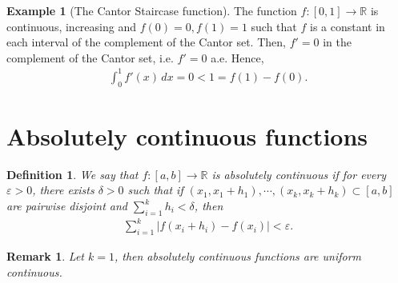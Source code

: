 \documentclass[11pt]{book}
\newtheorem{definition}{Definition}[chapter]
\newtheorem{remark}{Remark}[chapter]
\theoremstyle{definition}
\newtheorem{example}{Example}[chapter]
\numberwithin{equation}{chapter}
\begin{document}
\medskip

\begin{example}[The Cantor Staircase function]
The function $f: [0,1] \to \mathbb{R}$ is continuous, increasing and $f(0) = 0, f(1) = 1$ such that $f$ is a constant in each interval of the complement of the Cantor set. Then, $f' = 0$ in the complement of the Cantor set, i.e. $f' = 0$ a.e. Hence,
\begin{align*}
    \int^1_0 f'(x) \,dx = 0 < 1 = f(1) - f(0).
\end{align*}
\end{example}

\medskip


\section{Absolutely continuous functions}

\begin{definition}
We say that $f:[a,b] \to \mathbb{R}$ is absolutely continuous if for every $\varepsilon > 0$, there exists $\delta > 0$ such that if $(x_1,x_1+h_1), \cdots, (x_k,x_k+h_k) \subset [a,b]$ are pairwise disjoint and $\sum^k_{i=1} h_i < \delta$, then 
\begin{align*}
    \sum^k_{i=1} \left|f(x_i+h_i) - f(x_i)\right| < \varepsilon.
\end{align*}
\end{definition}

\begin{remark}
Let $k = 1$, then absolutely continuous functions are uniform continuous.
\end{remark}

\medskip
\end{document}
